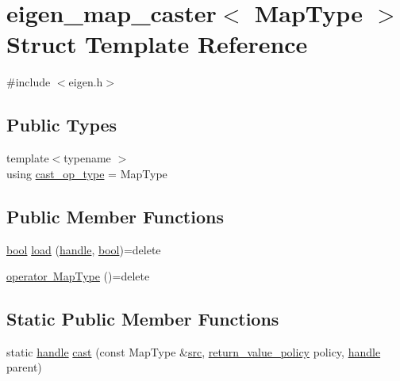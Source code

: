 \hypertarget{structeigen__map__caster}{}\section{eigen\+\_\+map\+\_\+caster$<$ Map\+Type $>$ Struct Template Reference}
\label{structeigen__map__caster}


{\ttfamily \#include $<$eigen.\+h$>$}

\subsection*{Public Types}
\begin{DoxyCompactItemize}
\item 
{\footnotesize template$<$typename $>$ }\\using \mbox{\hyperlink{structeigen__map__caster_a43b715680bfd06ff00ca9caa2ca07c9d}{cast\+\_\+op\+\_\+type}} = Map\+Type
\end{DoxyCompactItemize}
\subsection*{Public Member Functions}
\begin{DoxyCompactItemize}
\item 
\mbox{\hyperlink{asdl_8h_af6a258d8f3ee5206d682d799316314b1}{bool}} \mbox{\hyperlink{structeigen__map__caster_a901a2ca1d09920c5b6cd7a86676960d3}{load}} (\mbox{\hyperlink{classhandle}{handle}}, \mbox{\hyperlink{asdl_8h_af6a258d8f3ee5206d682d799316314b1}{bool}})=delete
\item 
\mbox{\hyperlink{structeigen__map__caster_a792b828f9b4bae6fd5cc16b155cf42b6}{operator Map\+Type}} ()=delete
\end{DoxyCompactItemize}
\subsection*{Static Public Member Functions}
\begin{DoxyCompactItemize}
\item 
static \mbox{\hyperlink{classhandle}{handle}} \mbox{\hyperlink{structeigen__map__caster_aed7867693cf11abd62f586672ef45316}{cast}} (const Map\+Type \&\mbox{\hyperlink{_s_d_l__opengl__glext_8h_a72e0fdf0f845ded60b1fada9e9195cd7}{src}}, \mbox{\hyperlink{detail_2common_8h_adde72ab1fb0dd4b48a5232c349a53841}{return\+\_\+value\+\_\+policy}} policy, \mbox{\hyperlink{classhandle}{handle}} parent)
\end{DoxyCompactItemize}
